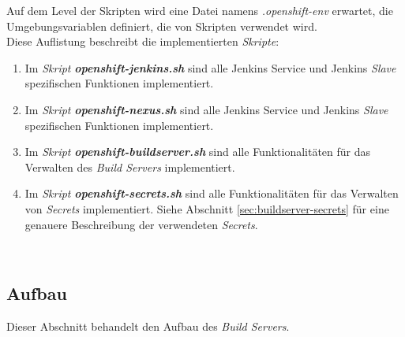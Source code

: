 Auf dem Level der Skripten wird eine Datei namens \emph{.openshift-env} erwartet, die Umgebungsvariablen definiert, die von Skripten verwendet wird.\\

Diese Auflistung beschreibt die implementierten \emph{Skripte}:
\begin{enumerate}
	\item Im \emph{Skript} \textbf{\emph{openshift-jenkins.sh}} sind alle Jenkins Service und Jenkins \emph{Slave} spezifischen Funktionen implementiert.
	\item Im \emph{Skript} \textbf{\emph{openshift-nexus.sh}} sind alle Jenkins Service und Jenkins \emph{Slave} spezifischen Funktionen implementiert.
	\item Im \emph{Skript} \textbf{\emph{openshift-buildserver.sh}} sind alle Funktionalitäten für das Verwalten des \emph{Build Servers} implementiert.
	\item Im \emph{Skript} \textbf{\emph{openshift-secrets.sh}} sind alle Funktionalitäten für das Verwalten von \emph{Secrets} implementiert. Siehe Abschnitt \ref{sec:buildserver-secrets} für eine genauere Beschreibung der verwendeten \emph{Secrets}.
\end{enumerate}

\ \subsection{Aufbau}
Dieser Abschnitt behandelt den Aufbau des \emph{Build Servers}. 


